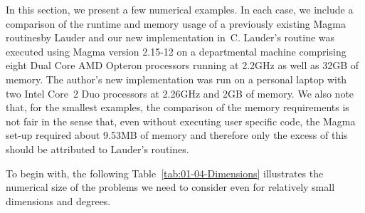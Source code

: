 In this section, we present a few numerical examples.  In each 
case, we include a comparison of the runtime and memory usage of 
a previously existing {\sc Magma} routines\footnotemark by Lauder 
and our new implementation in~C.  Lauder's routine was executed 
using {\sc Magma} version {2.15-12} on a departmental machine 
comprising eight Dual Core AMD Opteron processors running at 2.2GHz 
as well as 32GB of memory.  The author's new implementation was 
run on a personal laptop with two Intel Core~2 Duo processors at 
2.26GHz and 2GB of memory.  We also note that, for the smallest 
examples, the comparison of the memory requirements is not fair 
in the sense that, even without executing user specific code, the 
{\sc Magma} set-up required about 9.53MB of memory and therefore 
only the excess of this should be attributed to Lauder's routines.


To begin with, the following Table~\ref{tab:01-04-Dimensions} illustrates the 
numerical size of the problems we need to consider even for relatively small 
dimensions and degrees.

